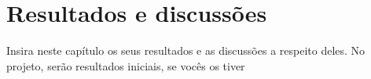 \chapter{Resultados e discussões}

Insira neste capítulo os seus resultados e as discussões a respeito deles.
No projeto, serão resultados iniciais, se vocês os tiver
